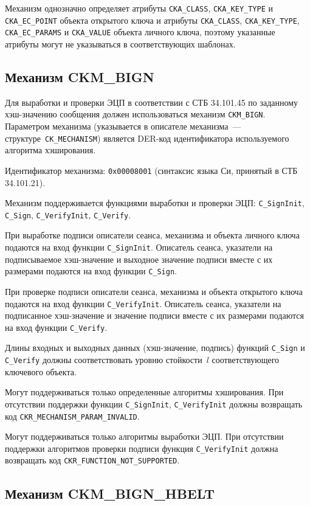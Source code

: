 Механизм однозначно определяет атрибуты 
\verb|CKA_CLASS|, \verb|CKA_KEY_TYPE| и \verb|CKA_EC_POINT|
объекта открытого ключа и атрибуты
\verb|CKA_CLASS|, \verb|CKA_KEY_TYPE|, \verb|CKA_EC_PARAMS| и 
\verb|CKA_VALUE| объекта личного ключа,
поэтому указанные атрибуты могут не указываться в
соответствующих шаблонах.

\subsection{Механизм CKM\_BIGN}\label{CRYPTOKI.SignHSpec}

Для выработки и проверки ЭЦП в соответствии с СТБ 34.101.45 по 
заданному хэш-значению сообщения должен использоваться механизм 
\verb|CKM_BIGN|. 
%
Параметром механизма (указывается в описателе механизма~--- 
структуре~\verb|CK_MECHANISM|) является DER-код идентификатора 
используемого алгоритма хэширования.

Идентификатор механизма: \texttt{0x00008001} 
(синтаксис языка Си, принятый в СТБ 34.101.21). 

Механизм поддерживается функциями выработки и проверки ЭЦП: 
\verb|C_SignInit|, \verb|C_Sign|, \verb|C_VerifyInit|, \verb|C_Verify|.

При выработке подписи описатели сеанса, механизма и объекта
личного ключа подаются на вход функции \verb|C_SignInit|.
Описатель сеанса, указатели на подписываемое хэш-значение и выходное 
значение подписи вместе с их размерами подаются на вход функции 
\verb|C_Sign|.

При проверке подписи описатели сеанса, механизма и объекта
открытого ключа подаются на вход функции \verb|C_VerifyInit|.
Описатель сеанса, указатели на подписанное хэш-значение и значение подписи 
вместе с их размерами подаются на вход функции \verb|C_Verify|.

Длины входных и выходных данных (хэш-значение, подпись) функций
\verb|C_Sign| и \verb|C_Verify| должны соответствовать
уровню стойкости~$l$ соответствующего ключевого объекта.

Могут поддерживаться только определенные алгоритмы хэширования.
При отсутствии поддержки функции \verb|C_SignInit|,
\verb|C_VerifyInit| должны возвращать код 
\verb|CKR_MECHANISM_PARAM_INVALID|.

Могут поддерживаться только алгоритмы выработки ЭЦП.
При отсутствии поддержки алгоритмов проверки подписи
функция \verb|C_VerifyInit| должна возвращать код 
\verb|CKR_FUNCTION_NOT_SUPPORTED|.

\subsection{Механизм CKM\_BIGN\_HBELT}\label{CRYPTOKI.SignHBelt}

